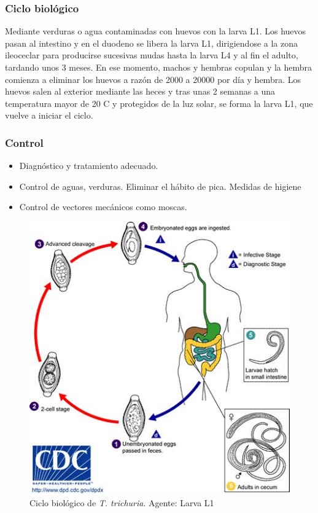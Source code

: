 \begin{multicols}{2}
	\subsubsection{Ciclo biológico}
	Mediante verduras o agua contaminadas con huevos con la larva L1. Los huevos pasan al intestino y en el duodeno se libera la larva L1, dirigiendose a la zona ileoceclar para producirse sucesivas mudas hasta la larva L4 y al fin el adulto, tardando unos 3 meses. En ese momento, machos y hembras copulan y la hembra comienza a eliminar los huevos a razón de 2000 a 20000 por día y hembra. Los huevos salen al exterior mediante las heces y tras unas 2 semanas a una temperatura mayor de 20 C y protegidos de la luz solar, se forma la larva L1, que vuelve a iniciar el ciclo.
	\subsubsection{Control}
	\begin{itemize}[itemsep=0pt,parsep=0pt,topsep=0pt,partopsep=0pt]
		\item Diagnóstico y tratamiento adecuado.
		\item Control de aguas, verduras. Eliminar el hábito de pica. Medidas de higiene
		\item Control de vectores mecánicos como moscas.
	\end{itemize}
	\columnbreak
	\begin{figure}[H]
		\centering
		\includegraphics[width=0.95\columnwidth]{A.imagenes/ACV-BioSan-Parasit-TTrichuriaCBios}
		\caption[Ciclo biológico de \textit{T. trichuria}]{Ciclo biológico de \textit{T. trichuria}. Agente: Larva L1 \label{fig:PARASIT:TTrichuriaCBios}}
	\end{figure}
\end{multicols}

